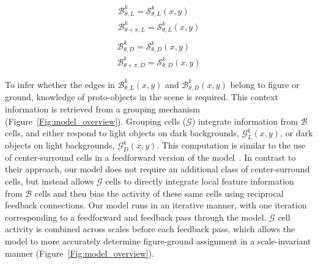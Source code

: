 \begin{equation}
\begin{split}
\mathcal{B}^k_{\theta,L} = \mathcal{S}^k_{\theta,L}(x,y)\\
\mathcal{B}^k_{\theta+\pi,L} = \mathcal{S}^k_{\theta,L}(x,y)\\
\end{split}
\end{equation}
\begin{equation}
\begin{split}
\mathcal{B}^k_{\theta,D} = \mathcal{S}^k_{\theta,D}(x,y)\\
\mathcal{B}^k_{\theta+\pi,D} = \mathcal{S}^k_{\theta,D}(x,y)
\end{split}
\end{equation}

To infer whether the edges in $\mathcal{B}^k_{\theta,L}(x,y)$ and $\mathcal{B}^k_{\theta,D}(x,y)$ belong to
figure or ground, knowledge of proto-objects in the scene is required. This
context information is retrieved from a
grouping
mechanism (Figure~\ref{Fig:model_overview}). Grouping cells ($\mathcal{G}$) integrate information from
$\mathcal{B}$
cells, and 
either respond to light objects on dark backgrounds, $\mathcal{G}^k_{L}(x,y)$, or dark objects on light backgrounds, $\mathcal{G}^k_{D}(x,y)$. This computation is similar to the use of center-surround cells in a feedforward version of the model~\citep{Russell_etal14}. In contrast to their approach, our model does not require an additional class of center-surround cells, but instead allows
$\mathcal{G}$ cells
to directly integrate local feature information from
$\mathcal{B}$
cells and then bias the activity of these same cells using reciprocal feedback connections. Our model runs in an iterative manner, with one iteration corresponding to a feedforward and feedback pass through the model.
$\mathcal{G}$
cell activity is combined across scales before each feedback pass, which allows the model to more accurately determine figure-ground assignment in a scale-invariant manner (Figure~\ref{Fig:model_overview}).

